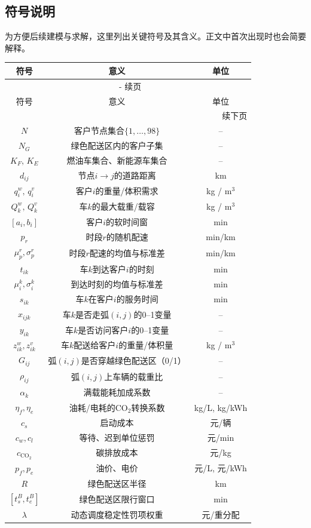 \documentclass[12pt,a4paper]{article}
\renewcommand{\thetable}{\arabic{section}-\arabic{table}}
\begin{document}
\subsection{符号说明}

为方便后续建模与求解，这里列出关键符号及其含义。正文中首次出现时也会简要解释。

\setlength{\tabcolsep}{20pt}
\begin{longtable}{ccc}
    \toprule
    符号 & 意义 & 单位 \\
    \midrule
    \endfirsthead
    \multicolumn{3}{c}{{\tablename\ \thetable{} 续页}} \\
    \toprule
    符号 & 意义 & 单位 \\
    \midrule
    \endhead
    \midrule
    \multicolumn{3}{r}{{续下页}} \\
    \endfoot
    \bottomrule
    \endlastfoot
    $N$ & 客户节点集合$\{1,\dots,98\}$ & -- \\
    $N_G$ & 绿色配送区内的客户子集 & -- \\
    $K_F,\,K_E$ & 燃油车集合、新能源车集合 & -- \\
    $d_{ij}$ & 节点$i\to j$的道路距离 & km \\
    $q_i^w,\,q_i^v$ & 客户$i$的重量/体积需求 & kg / m$^3$ \\
    $Q_k^w,\,Q_k^v$ & 车$k$的最大载重/载容 & kg / m$^3$ \\
    $[a_i,b_i]$ & 客户$i$的软时间窗 & min \\
    $p_r$ & 时段$r$的随机配速 & min/km \\
    $\mu_p^r,\sigma_p^r$ & 时段$r$配速的均值与标准差 & min/km \\
    $t_{ik}$ & 车$k$到达客户$i$的时刻 & min \\
    $\mu_i^k,\sigma_i^k$ & 到达时刻的均值与标准差 & min \\
    $s_{ik}$ & 车$k$在客户$i$的服务时间 & min \\
    $x_{ijk}$ & 车$k$是否走弧$(i,j)$的0--1变量 & -- \\
    $y_{ik}$ & 车$k$是否访问客户$i$的0--1变量 & -- \\
    $z_{ik}^w,z_{ik}^v$ & 车$k$配送给客户$i$的重量/体积量 & kg / m$^3$ \\
    $G_{ij}$ & 弧$(i,j)$是否穿越绿色配送区（0/1） & -- \\
    $\rho_{ij}$ & 弧$(i,j)$上车辆的载重比 & -- \\
    $\alpha_k$ & 满载能耗加成系数 & -- \\
    $\eta_f,\eta_e$ & 油耗/电耗的CO$_2$转换系数 & kg/L, kg/kWh \\
    $c_s$ & 启动成本 & 元/辆 \\
    $c_w,c_l$ & 等待、迟到单位惩罚 & 元/min \\
    $c_{\mathrm{CO_2}}$ & 碳排放成本 & 元/kg \\
    $p_f,p_e$ & 油价、电价 & 元/L, 元/kWh \\
    $R$ & 绿色配送区半径 & km \\
    $[t_s^B,t_e^B]$ & 绿色配送区限行窗口 & min \\
    $\lambda$ & 动态调度稳定性罚项权重 & 元/重分配 \\
\end{longtable}
\end{document}
